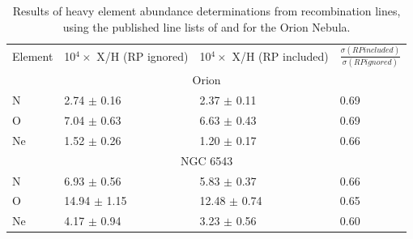 \documentclass[useAMS,usenatbib]{mn2e}
\begin{document}
\begin{table}
\begin{tabular}{l ll l}
Element & 10$^4 \times$ X/H (RP ignored) & 10$^4 \times$ X/H (RP included) & $\frac{\sigma (RP included)}{\sigma (RP ignored)}$ \\
\multicolumn{4}{c}{Orion}\\

N & 2.74 $\pm$ 0.16 & 2.37 $\pm$ 0.11 & 0.69 \\
O & 7.04 $\pm$ 0.63 & 6.63 $\pm$ 0.43 & 0.69 \\
Ne & 1.52 $\pm$ 0.26 & 1.20 $\pm$ 0.17 & 0.66 \\

\multicolumn{4}{c}{NGC 6543} \\

N & 6.93 $\pm$  0.56 & 5.83 $\pm$  0.37 & 0.66 \\
O & 14.94 $\pm$ 1.15 & 12.48 $\pm$ 0.74 & 0.65 \\
Ne & 4.17 $\pm$ 0.94 & 3.23 $\pm$ 0.56 & 0.60 \\

\end{tabular}
\caption{Results of heavy element abundance determinations from recombination lines, using the published line lists of \citet{2004MNRAS.351.1026W} and \citet{2004MNRAS.355..229E} for the Orion Nebula.}
\label{RP_numbers}
\end{table}
\end{document}
